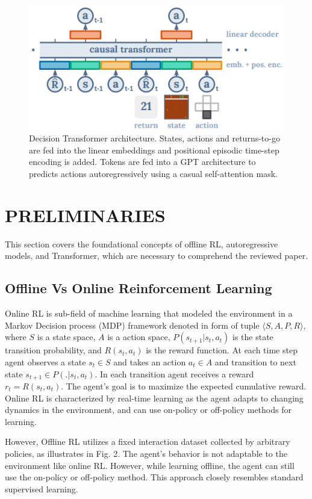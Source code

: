 \documentclass[conference]{IEEEtran}
\begin{document}
\begin{figure}[htbp]
\centerline{\includegraphics[scale=0.51]{Images/dt_intuition.png}}
\caption{Decision Transformer architecture. States, actions and returns-to-go are fed into the linear embeddings and positional episodic time-step encoding is added. Tokens are fed into a GPT architecture to
predicts actions autoregressively using a casual self-attention
mask\cite{b1}.}
\label{fig}
\end{figure}

\section{PRELIMINARIES}
This section covers the foundational concepts of offline RL, autoregressive models, and Transformer, which are necessary to comprehend the reviewed paper.

\subsection{Offline Vs Online Reinforcement Learning}
Online RL is sub-field of machine learning that modeled the environment in a Markov Decision process (MDP) framework denoted in form of tuple \( \langle S, A, P, R \rangle\), where \(S\) is a state space, \(A\) is a action space, \(P(s_{t+1} | s_t, a_t)\) is the state transition probability, and \(R (s_t, a_t)\) is the reward function. At each time step agent observes a state \( s_t \in S\) and takes an action \( a_t \in A\) and transition to next state \( s_{t+1} \in P(.|s_t, a_t)\). In each transition agent receives a reward \( r_t = R(s_t,a_t)\). The agent's goal is to maximize the expected cumulative reward. Online RL is characterized by real-time learning as the agent adapts to changing dynamics in the environment, and can use on-policy or off-policy methods for learning.

However, Offline RL \cite{b7} utilizes a fixed interaction dataset collected by arbitrary policies, as illustrates in Fig. 2. The agent's behavior is not adaptable to the environment like online RL. However, while learning offline, the agent can still use the on-policy or off-policy method. This approach closely resembles standard supervised learning.
\end{document}
